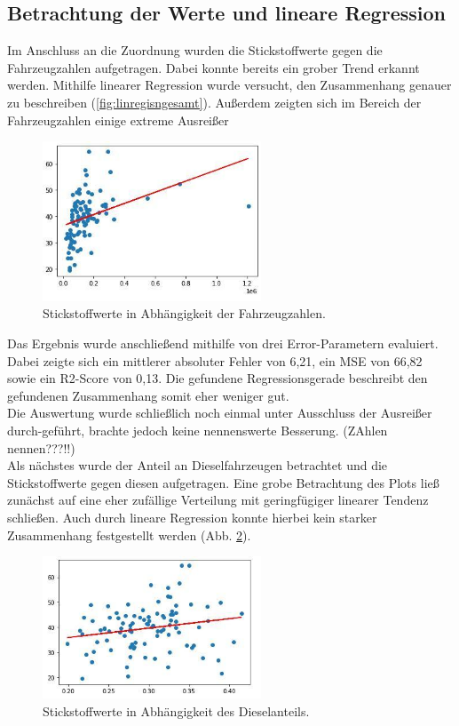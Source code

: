 \documentclass[11pt,a4paper,oneside,german]{article}
\begin{document}
	\subsection{Betrachtung der Werte und lineare Regression}
	
	Im Anschluss an die Zuordnung wurden die Stickstoffwerte gegen die Fahrzeugzahlen aufgetragen. Dabei konnte bereits ein grober Trend erkannt werden. Mithilfe linearer Regression wurde versucht, den Zusammenhang genauer zu beschreiben (\ref{fig:linregisngesamt}). Außerdem zeigten sich im Bereich der Fahrzeugzahlen einige extreme Ausreißer
	
	\begin{figure}[h!]
		\centering
		\includegraphics[width=6.5cm]{linreginsgesamt.jpg}
		\caption{Stickstoffwerte in Abhängigkeit der Fahrzeugzahlen.}
		\label{fig:linreginsgesamt}
	\end{figure}
	
	Das Ergebnis wurde anschließend mithilfe von drei Error-Parametern evaluiert. Dabei zeigte sich ein mittlerer absoluter Fehler von 6,21, ein MSE von 66,82 sowie ein R2-Score von 0,13. Die gefundene Regressionsgerade beschreibt den gefundenen Zusammenhang somit eher weniger gut. \\
	Die Auswertung wurde schließlich noch einmal unter Ausschluss der Ausreißer durch-geführt, brachte jedoch keine nennenswerte Besserung. (ZAhlen nennen???!!) \\
	Als nächstes wurde der Anteil an Dieselfahrzeugen betrachtet und die Stickstoffwerte gegen diesen aufgetragen. Eine grobe Betrachtung des Plots ließ zunächst auf eine eher zufällige Verteilung mit geringfügiger linearer Tendenz schließen. Auch durch lineare Regression konnte hierbei kein starker Zusammenhang festgestellt werden (Abb. \ref{fig:linregdieselanteil}).
	
	\begin{figure}[H]
		\centering
		\includegraphics[width=6.5cm]{linregdieselanteil.jpg}
		\caption{Stickstoffwerte in Abhängigkeit des Dieselanteils.}
		\label{fig:linregdieselanteil}
	\end{figure}
	
\end{document}
